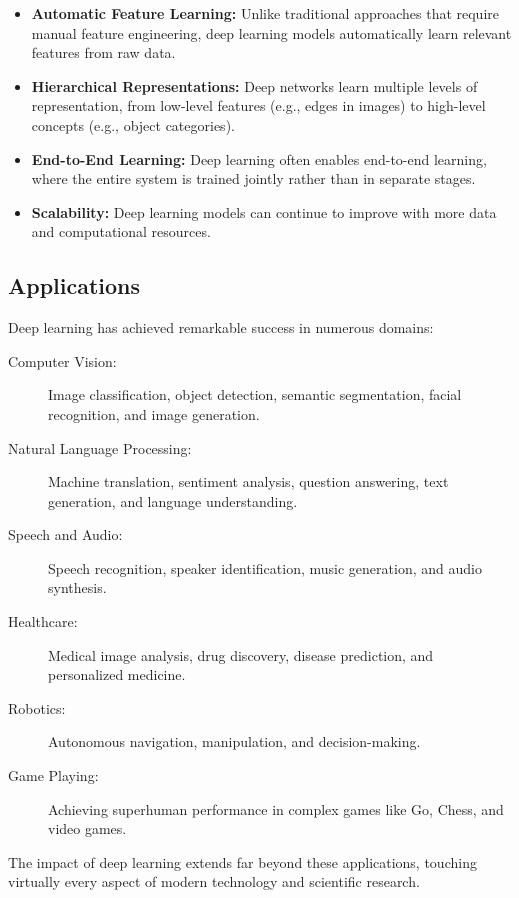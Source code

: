 \begin{itemize}
    \item \textbf{Automatic Feature Learning:} Unlike traditional approaches that require manual feature engineering, deep learning models automatically learn relevant features from raw data.
    
    \item \textbf{Hierarchical Representations:} Deep networks learn multiple levels of representation, from low-level features (e.g., edges in images) to high-level concepts (e.g., object categories).
    
    \item \textbf{End-to-End Learning:} Deep learning often enables end-to-end learning, where the entire system is trained jointly rather than in separate stages.
    
    \item \textbf{Scalability:} Deep learning models can continue to improve with more data and computational resources.
\end{itemize}

\subsection{Applications}

Deep learning has achieved remarkable success in numerous domains:

\begin{description}
    \item[Computer Vision:] Image classification, object detection, semantic segmentation, facial recognition, and image generation.
    
    \item[Natural Language Processing:] Machine translation, sentiment analysis, question answering, text generation, and language understanding.
    
    \item[Speech and Audio:] Speech recognition, speaker identification, music generation, and audio synthesis.
    
    \item[Healthcare:] Medical image analysis, drug discovery, disease prediction, and personalized medicine.
    
    \item[Robotics:] Autonomous navigation, manipulation, and decision-making.
    
    \item[Game Playing:] Achieving superhuman performance in complex games like Go, Chess, and video games.
\end{description}

The impact of deep learning extends far beyond these applications, touching virtually every aspect of modern technology and scientific research.

